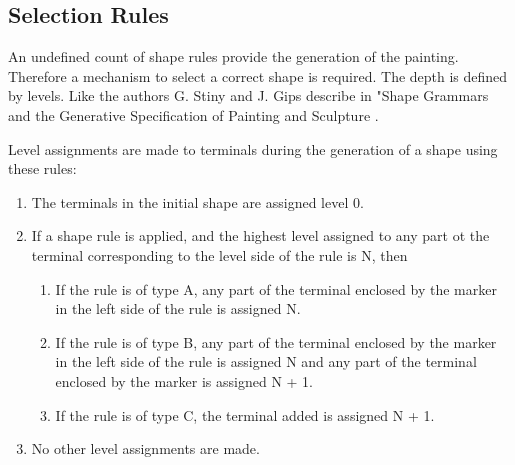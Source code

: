 \documentclass[11pt, a4paper]{report}
\begin{document}
\subsection{Selection Rules}
An undefined count of shape rules provide the generation of the painting. Therefore a mechanism to select a correct shape is required. The depth is defined by levels. Like the authors G. Stiny and J. Gips describe in "Shape Grammars and the Generative Specification of Painting and Sculpture  \citep{shapeGrammars:1972}.
\begin{displayquote}
    Level assignments are made to terminals during the generation of a shape using these rules:
    \begin{enumerate}
        \item The terminals in the initial shape are assigned level 0.
        \item If a shape rule is applied, and the highest level assigned to any part ot the terminal corresponding to the level side of the rule is N, then
        \begin{enumerate}
            \item If the rule is of type A, any part of the terminal enclosed by the marker in the left side of the rule is assigned N.
            \item If the rule is of type B, any part of the terminal enclosed by the marker in the left side of the rule is assigned N and any part of the terminal enclosed by the marker is assigned N + 1.
            \item If the rule is of type C, the terminal added is assigned N + 1.
        \end{enumerate}
        \item No other level assignments are made.
    \end{enumerate}
\end{displayquote}
\end{document}
